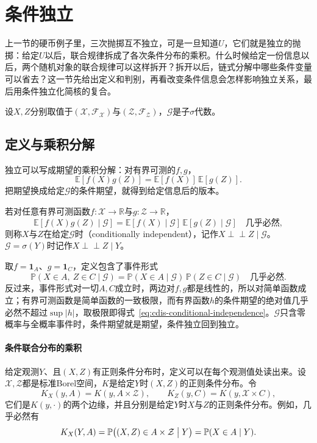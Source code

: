 \section{条件独立}
\label{sec:cdis-conditional-independence}

上一节的硬币例子里，三次抛掷互不独立，可是一旦知道$U$，它们就是独立的抛掷：给定$U$以后，联合规律拆成了各次条件分布的乘积。什么时候给定一份信息以后，两个随机对象的联合规律可以这样拆开？拆开以后，链式分解中哪些条件变量可以省去？这一节先给出定义和判别，再看改变条件信息会怎样影响独立关系，最后用条件独立化简核的复合。

设$X,Z$分别取值于$(\mathcal{X},\mathcal{F}_{\mathcal{X}})$与$(\mathcal{Z},\mathcal{F}_{\mathcal{Z}})$，$\mathcal{G}$是子$\sigma$代数。

\subsection{定义与乘积分解}
\label{sec:cdis-ci-definition}

独立可以写成期望的乘积分解：对有界可测的$f,g$，
\[
 \mathbb{E}[f(X)g(Z)]=\mathbb{E}[f(X)]\,\mathbb{E}[g(Z)].
\]
把期望换成给定$\mathcal{G}$的条件期望，就得到给定信息后的版本。

\begin{definition}[条件独立]
\label{def:cdis-conditional-independence}
若对任意有界可测函数$f:\mathcal{X}\to\mathbb{R}$与$g:\mathcal{Z}\to\mathbb{R}$，
\begin{equation}
 \mathbb{E}[f(X)g(Z)\mid\mathcal{G}]=\mathbb{E}[f(X)\mid\mathcal{G}]\,\mathbb{E}[g(Z)\mid\mathcal{G}]\quad\text{几乎必然},
 \label{eq:cdis-conditional-independence}
\end{equation}
则称$X$与$Z$在给定$\mathcal{G}$时（conditionally independent），记作$X\perp\!\!\!\perp Z\mid\mathcal{G}$。$\mathcal{G}=\sigma(Y)$时记作$X\perp\!\!\!\perp Z\mid Y$。
\end{definition}

取$f=\mathbf{1}_{A}$、$g=\mathbf{1}_{C}$，定义包含了事件形式
\[
 \mathbb{P}(X\in A,\ Z\in C\mid\mathcal{G})=\mathbb{P}(X\in A\mid\mathcal{G})\,\mathbb{P}(Z\in C\mid\mathcal{G})\quad\text{几乎必然}.
\]
反过来，事件形式对一切$A,C$成立时，两边对$f,g$都是线性的，所以对简单函数成立；有界可测函数是简单函数的一致极限，而有界函数$h$的条件期望的绝对值几乎必然不超过$\sup\lvert h\rvert$，取极限即得式~\eqref{eq:cdis-conditional-independence}。$\mathcal{G}$只含零概率与全概率事件时，条件期望就是期望，条件独立回到独立。

\paragraph{条件联合分布的乘积}
给定观测$Y$、且$(X,Z)$有正则条件分布时，定义可以在每个观测值处读出来。设$\mathcal{X},\mathcal{Z}$都是标准Borel空间，$K$是给定$Y$时$(X,Z)$的正则条件分布。令
\[
 K_X(y,A)=K(y,A\times\mathcal{Z}),\qquad K_Z(y,C)=K(y,\mathcal{X}\times C),
\]
它们是$K(y,\cdot)$的两个边缘，并且分别是给定$Y$时$X$与$Z$的正则条件分布。例如，几乎必然有
\[
 K_X(Y,A)=\mathbb{P}\bigl((X,Z)\in A\times\mathcal{Z}\bigm|Y\bigr)=\mathbb{P}(X\in A\mid Y).
\]

